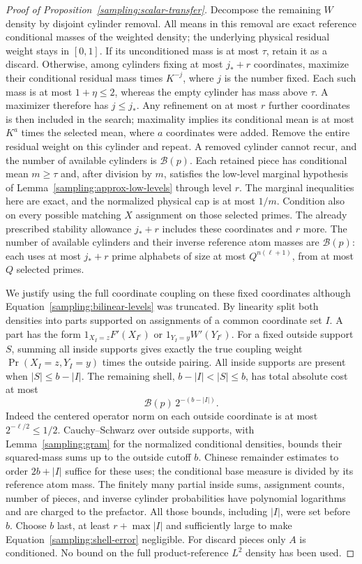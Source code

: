 \begin{proof}[Proof of Proposition~\ref{sampling:scalar-transfer}]
Decompose the remaining $W$ density by disjoint cylinder removal.
All means in this removal are exact reference conditional masses of the
weighted density; the underlying physical residual weight stays in $[0,1]$.
If its unconditioned mass is at most $\tau$, retain it as a discard.
Otherwise, among cylinders fixing at most $j_*+r$ coordinates, maximize
their conditional residual mass times $K^{-j}$, where $j$ is the number
fixed.  Each such mass is at most $1+\eta\le2$, whereas the empty
cylinder has mass above $\tau$.  A maximizer therefore has $j\le j_*$.
Any refinement on at most $r$ further coordinates is then included in the
search; maximality implies its conditional mean is at most $K^a$ times
the selected mean, where $a$ coordinates were added.
Remove the entire residual weight on this cylinder and repeat.
A removed cylinder cannot recur, and the number of available cylinders
is $\mathcal B(p)$.  Each retained piece has conditional mean $m\ge\tau$
and, after division by $m$, satisfies the low-level marginal hypothesis
of Lemma~\ref{sampling:approx-low-levels} through level $r$.
The marginal inequalities here are exact, and the normalized physical cap
is at most $1/m$.  Condition also on every possible matching $X$ assignment
on those selected primes.  The already prescribed stability allowance
$j_*+r$ includes these coordinates and $r$ more.  The number of available
cylinders and their inverse reference atom masses are $\mathcal B(p)$:
each uses at most $j_*+r$ prime alphabets of size at most
$Q^{n(\ell+1)}$, from at most $Q$ selected primes.

We justify using the full coordinate coupling on these fixed coordinates
although Equation~\eqref{sampling:bilinear-levels} was truncated.
By linearity split both densities into parts supported on assignments of
a common coordinate set $I$.  A part has the form
$1_{X_I=z}F'(X_{I^c})$ or $1_{Y_I=y}W'(Y_{I^c})$.
For a fixed outside support $S$, summing all inside supports gives exactly
the true coupling weight $\Pr(X_I=z,Y_I=y)$ times the outside pairing.
All inside supports are present when $|S|\le b-|I|$.
The remaining shell, $b-|I|<|S|\le b$, has total absolute cost at most
\begin{equation}\label{sampling:shell-error}
 \mathcal B(p)\,2^{-(b-|I|)}.
\end{equation}
Indeed the centered operator norm on each outside coordinate is at most
$2^{-\ell/2}\le1/2$.  Cauchy--Schwarz over outside supports, with
Lemma~\ref{sampling:gram} for the normalized conditional densities,
bounds their squared-mass sums up to the outside cutoff $b$.
Chinese remainder estimates to order $2b+|I|$ suffice for these uses;
the conditional base measure is divided by its reference atom mass.
The finitely many partial inside sums,
assignment counts, number of pieces, and inverse cylinder probabilities
have polynomial logarithms and are charged to the prefactor.
All those bounds, including $|I|$, were set before $b$.
Choose $b$ last, at least $r+\max|I|$ and sufficiently large to make
Equation~\eqref{sampling:shell-error} negligible.  For discard pieces only
$A$ is conditioned.  No bound on the full product-reference $L^2$ density
has been used.


\end{proof}
